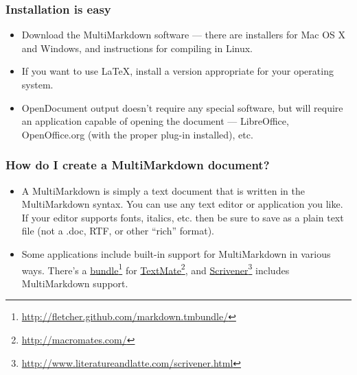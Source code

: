 \begin{frame}

\frametitle{Installation is easy}
\label{installationiseasy}

\begin{itemize}
\item Download the MultiMarkdown software --- there are installers for Mac OS X
 and Windows, and instructions for compiling in Linux.

\item If you want to use LaTeX, install a version appropriate for your operating
 system.

\item OpenDocument output doesn't require any special software, but will require
 an application capable of opening the document --- LibreOffice,
 OpenOffice.org (with the proper plug-in installed), etc.

\end{itemize}

\end{frame}

\begin{frame}

\frametitle{How do I create a MultiMarkdown document?}
\label{howdoicreateamultimarkdowndocument}

\begin{itemize}
\item A MultiMarkdown is simply a text document that is written in the
 MultiMarkdown syntax. You can use any text editor or application you like.
 If your editor supports fonts, italics, etc. then be sure to save as a plain
 text file (not a .doc, RTF, or other ``rich'' format).

\item Some applications include built-in support for MultiMarkdown in various
 ways. There's a \href{http://fletcher.github.com/markdown.tmbundle/}{bundle}\footnote{\href{http://fletcher.github.com/markdown.tmbundle/}{http:/\slash fletcher.github.com\slash markdown.tmbundle\slash }} for \href{http://macromates.com/}{TextMate}\footnote{\href{http://macromates.com/}{http:/\slash macromates.com\slash }}, and \href{http://www.literatureandlatte.com/scrivener.html}{Scrivener}\footnote{\href{http://www.literatureandlatte.com/scrivener.html}{http:/\slash www.literatureandlatte.com\slash scrivener.html}} includes
 MultiMarkdown support.

\end{itemize}

\end{frame}

